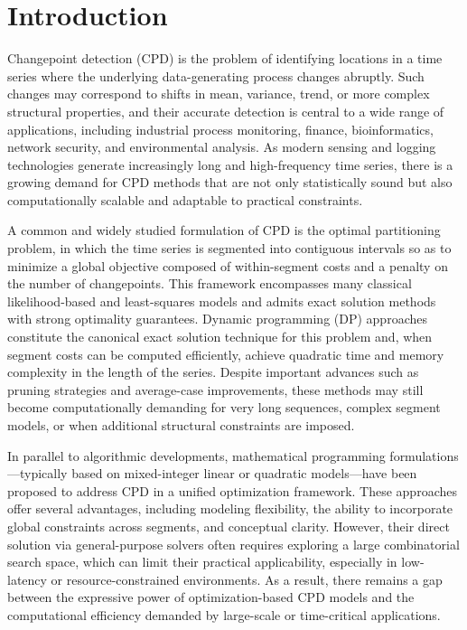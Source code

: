 \documentclass[runningheads]{llncs}
\begin{document}
\section{Introduction}	\label{sec:introducion}
Changepoint detection (CPD) is the problem of identifying locations in a time series where the underlying data-generating process changes abruptly. Such changes may correspond to shifts in mean, variance, trend, or more complex structural properties, and their accurate detection is central to a wide range of applications, including industrial process monitoring, finance, bioinformatics, network security, and environmental analysis. As modern sensing and logging technologies generate increasingly long and high-frequency time series, there is a growing demand for CPD methods that are not only statistically sound but also computationally scalable and adaptable to practical constraints.

A common and widely studied formulation of CPD is the optimal partitioning problem, in which the time series is segmented into contiguous intervals so as to minimize a global objective composed of within-segment costs and a penalty on the number of changepoints. This framework encompasses many classical likelihood-based and least-squares models and admits exact solution methods with strong optimality guarantees. Dynamic programming (DP) approaches constitute the canonical exact solution technique for this problem and, when segment costs can be computed efficiently, achieve quadratic time and memory complexity in the length of the series. Despite important advances such as pruning strategies and average-case improvements, these methods may still become computationally demanding for very long sequences, complex segment models, or when additional structural constraints are imposed.

In parallel to algorithmic developments, mathematical programming formulations—typically based on mixed-integer linear or quadratic models—have been proposed to address CPD in a unified optimization framework. These approaches offer several advantages, including modeling flexibility, the ability to incorporate global constraints across segments, and conceptual clarity. However, their direct solution via general-purpose solvers often requires exploring a large combinatorial search space, which can limit their practical applicability, especially in low-latency or resource-constrained environments. As a result, there remains a gap between the expressive power of optimization-based CPD models and the computational efficiency demanded by large-scale or time-critical applications.
\end{document}
